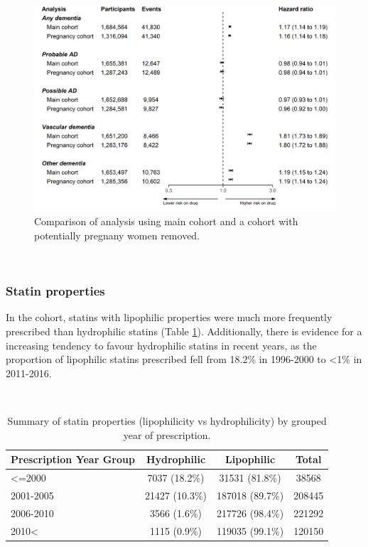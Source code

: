 \documentclass[a4paper, twoside]{templates/ociamthesis}
\begin{document}
\begin{figure}[H]
\includegraphics[width=1\linewidth]{figures/cprd-analysis/forester_pregnancy} \caption[Comparison of pregnancy analysis]{Comparison of analysis using main cohort and a cohort with potentially pregnany women removed.}\label{fig:pregnancyFig}
\end{figure}

~

\hypertarget{statin-properties-1}{%
\subsubsection{Statin properties}\label{statin-properties-1}}

In the cohort, statins with lipophilic properties were much more frequently prescribed than hydrophilic statins (Table \ref{tab:statinTypeTable-table}). Additionally, there is evidence for a increasing tendency to favour hydrophilic statins in recent years, as the proportion of lipophilic statins prescribed fell from 18.2\% in 1996-2000 to \textless1\% in 2011-2016.

~





\begin{table}[H]

\caption[Summary of statin properties (lipophilicity vs hydrophilicity).]{\label{tab:statinTypeTable-table}Summary of statin properties (lipophilicity vs hydrophilicity) by grouped year of prescription.}
\centering
\fontsize{7}{9}\selectfont
\begin{tabular}[t]{lccc}
\toprule
\textbf{\textbf{Prescription Year Group}} & \textbf{\textbf{Hydrophilic}} & \textbf{\textbf{Lipophilic}} & \textbf{\textbf{Total}}\\
\midrule
<=2000 & 7037 (18.2\%) & 31531 (81.8\%) & 38568\\
\midrule
2001-2005 & 21427 (10.3\%) & 187018 (89.7\%) & 208445\\
\midrule
2006-2010 & 3566 (1.6\%) & 217726 (98.4\%) & 221292\\
\midrule
2010< & 1115 (0.9\%) & 119035 (99.1\%) & 120150\\
\bottomrule
\end{tabular}
\end{table}
\end{document}
